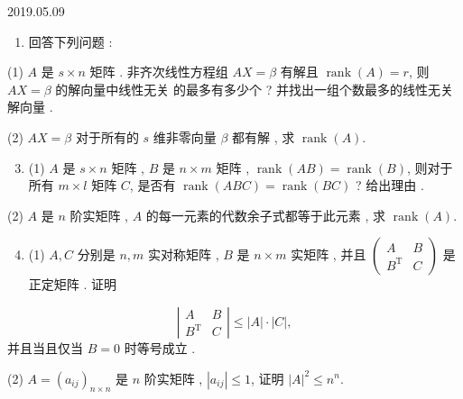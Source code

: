 \documentclass[10pt]{article}
\begin{document}
   

2019.05.09

\begin{enumerate}
  \item  回答下列问题 :
\end{enumerate}
(1) $A$  是  $s \times n$  矩阵 .  非齐次线性方程组  $A X=\beta$  有解且  $\operatorname{rank}(A)=r$,  则  $A X=\beta$  的解向量中线性无关   的最多有多少个 ?  并找出一组个数最多的线性无关解向量 .

(2) $A X=\beta$  对于所有的  $s$  维非零向量  $\beta$  都有解 ,  求  $\operatorname{rank}(A)$.

\begin{enumerate}
  \setcounter{enumi}{2}
  \item (1) $A$  是  $s \times n$  矩阵 , $B$  是  $n \times m$  矩阵 , $\operatorname{rank}(A B)=\operatorname{rank}(B)$,  则对于所有  $m \times l$  矩阵  $C$,  是否有  $\operatorname{rank}(A B C)=\operatorname{rank}(B C)$ ?  给出理由 .
\end{enumerate}
(2) $A$  是  $n$  阶实矩阵 , $A$  的每一元素的代数余子式都等于此元素 ,  求  $\operatorname{rank}(A)$.

\begin{enumerate}
  \setcounter{enumi}{3}
  \item (1) $A, C$  分别是  $n, m$  实对称矩阵 , $B$  是  $n \times m$  实矩阵 ,  并且  $\left(\begin{array}{cc}A & B \\ B^{\mathrm{T}} & C\end{array}\right)$  是正定矩阵 .  证明 
\end{enumerate}
$$
\left|\begin{array}{cc}
A & B \\
B^{\mathrm{T}} & C
\end{array}\right| \leqslant|A| \cdot|C|,
$$
 并且当且仅当  $B=0$  时等号成立 .

(2) $A=\left(a_{i j}\right)_{n \times n}$  是  $n$  阶实矩阵 , $\left|a_{i j}\right| \leqslant 1$,  证明  $|A|^{2} \leqslant n^{n}$.
\end{document}
